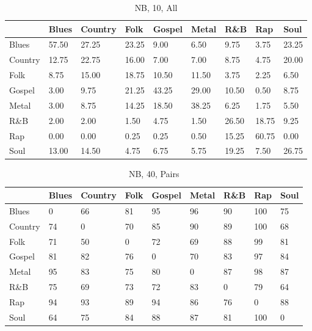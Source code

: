 \documentclass[a4paper,oneside]{article}
\begin{document}
\begin{table}[H]\centering
\caption{NB, 10, All}
\begin{tabu}{l|*{8}{l}}
&	Blues & Country & Folk & Gospel & Metal & R\&B & Rap & Soul \\ \hline
Blues & 57.50 & 27.25 & 23.25 & 9.00 & 6.50 & 9.75 & 3.75 & 23.25 \\
Country & 12.75 & 22.75 & 16.00 & 7.00 & 7.00 & 8.75 & 4.75 & 20.00 \\
Folk & 8.75 & 15.00 & 18.75 & 10.50 & 11.50 & 3.75 & 2.25 & 6.50 \\
Gospel & 3.00 & 9.75 & 21.25 & 43.25 & 29.00 & 10.50 & 0.50 & 8.75 \\
Metal & 3.00 & 8.75 & 14.25 & 18.50 & 38.25 & 6.25 & 1.75 & 5.50 \\
R\&B & 2.00 & 2.00 & 1.50 & 4.75 & 1.50 & 26.50 & 18.75 & 9.25 \\
Rap & 0.00 & 0.00 & 0.25 & 0.25 & 0.50 & 15.25 & 60.75 & 0.00 \\
Soul & 13.00 & 14.50 & 4.75 & 6.75 & 5.75 & 19.25 & 7.50 & 26.75 \\
\end{tabu}
\end{table}

\begin{table}[H]\centering
\caption{NB, 40, Pairs}
\begin{tabu}{l|*{8}{l}}
 & Blues & Country & Folk & Gospel & Metal & R\&B & Rap & Soul \\ \hline
Blues & 0 & 66 & 81 & 95 & 96 & 90 & 100 & 75 \\
Country & 74 & 0 & 70 & 85 & 90 & 89 & 100 & 68 \\
Folk & 71 & 50 & 0 & 72 & 69 & 88 & 99 & 81 \\
Gospel & 81 & 82 & 76 & 0 & 70 & 83 & 97 & 84 \\
Metal & 95 & 83 & 75 & 80 & 0 & 87 & 98 & 87 \\
R\&B & 75 & 69 & 73 & 72 & 83 & 0 & 79 & 64 \\
Rap & 94 & 93 & 89 & 94 & 86 & 76 & 0 & 88 \\
Soul & 64 & 75 & 84 & 88 & 87 & 81 & 100 & 0 \\
\end{tabu}
\end{table}
\end{document}
